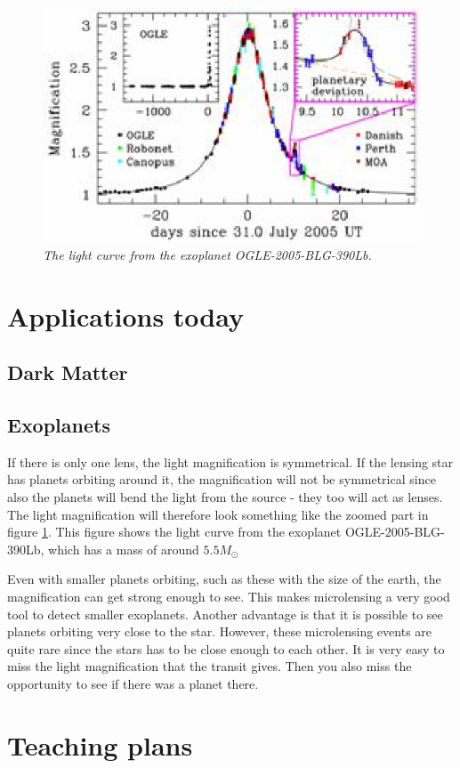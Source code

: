 \documentclass[12pt,a4paper,oneside]{scrartcl}
\begin{document}
\begin{figure}[p]
\centering
\includegraphics[width=0.5 \textwidth]{LightCurve_OGLE2005BLG390Lb}
\caption{\emph{The light curve from the exoplanet OGLE-2005-BLG-390Lb.}\label{fig:LightCurve}}
\end{figure}



\section{Applications today}

\subsection{Dark Matter}

\subsection{Exoplanets}
If there is only one lens, the light magnification is symmetrical. If the lensing star has planets orbiting around it, the magnification will not be symmetrical since also the planets will bend the light from the source - they too will act as lenses. The light magnification will therefore look something like the zoomed part in figure \ref{fig:LightCurve}. This figure shows the light curve from the exoplanet OGLE-2005-BLG-390Lb, which has a mass of around $5.5M_{\odot}$

Even with smaller planets orbiting, such as these with the size of the earth, the magnification can get strong enough to see. This makes microlensing a very good tool to detect smaller exoplanets. Another advantage is that it is possible to see planets orbiting very close to the star. However, these microlensing events are quite rare since the stars has to be close enough to each other. It is very easy to miss the light magnification that the transit gives. Then you also miss the opportunity to see if there was a planet there.  



\section{Teaching plans}
\end{document}
